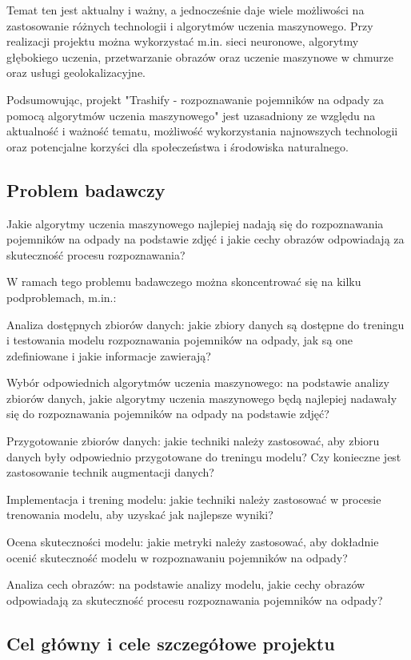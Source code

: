 \documentclass[12pt,oneside]{book}
\begin{document}
Temat ten jest aktualny i ważny, a jednocześnie daje wiele możliwości na zastosowanie różnych technologii i algorytmów uczenia maszynowego. Przy realizacji projektu można wykorzystać m.in. sieci neuronowe, algorytmy głębokiego uczenia, przetwarzanie obrazów oraz uczenie maszynowe w chmurze oraz usługi geolokalizacyjne.

Podsumowując, projekt "Trashify - rozpoznawanie pojemników na odpady za pomocą algorytmów uczenia maszynowego" jest uzasadniony ze względu na aktualność i ważność tematu, możliwość wykorzystania najnowszych technologii oraz potencjalne korzyści dla społeczeństwa i środowiska naturalnego.

\subsection{Problem badawczy}
Jakie algorytmy uczenia maszynowego najlepiej nadają się do rozpoznawania pojemników na odpady na podstawie zdjęć i jakie cechy obrazów odpowiadają za skuteczność procesu rozpoznawania?

W ramach tego problemu badawczego można skoncentrować się na kilku podproblemach, m.in.:

    Analiza dostępnych zbiorów danych: jakie zbiory danych są dostępne do treningu i testowania modelu rozpoznawania pojemników na odpady, jak są one zdefiniowane i jakie informacje zawierają?

    Wybór odpowiednich algorytmów uczenia maszynowego: na podstawie analizy zbiorów danych, jakie algorytmy uczenia maszynowego będą najlepiej nadawały się do rozpoznawania pojemników na odpady na podstawie zdjęć?

    Przygotowanie zbiorów danych: jakie techniki należy zastosować, aby zbioru danych były odpowiednio przygotowane do treningu modelu? Czy konieczne jest zastosowanie technik augmentacji danych?

    Implementacja i trening modelu: jakie techniki należy zastosować w procesie trenowania modelu, aby uzyskać jak najlepsze wyniki?

    Ocena skuteczności modelu: jakie metryki należy zastosować, aby dokładnie ocenić skuteczność modelu w rozpoznawaniu pojemników na odpady?

    Analiza cech obrazów: na podstawie analizy modelu, jakie cechy obrazów odpowiadają za skuteczność procesu rozpoznawania pojemników na odpady?

\subsection{Cel główny i cele szczegółowe projektu}
\end{document}

